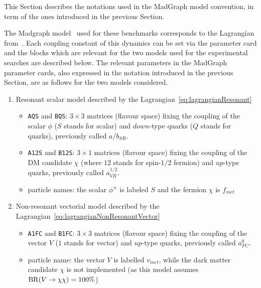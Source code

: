 % 



This Section describes the notations used in the MadGraph model convention, 
in term of the ones introduced in the previous Section.

The Madgraph model~\cite{MGmodel} used for these benchmarks corresponds to the Lagrangian from~\cite{AndreaFuksMaltoni}. 
Each coupling constant of this dynamics can be set via the parameter card and 
the blocks which are relevant for the two models used for the experimental searches are described below.
The relevant parameters in the MadGraph parameter cards, also expressed in the notation introduced in the 
previous Section, are as follows for the two models considered.

\begin{enumerate}

\item Resonant scalar model described by the Lagrangian~\eqref{eq:lagrangianResonant}
  \begin{itemize}
  \item \texttt{AQS} and \texttt{BQS}: $3\times 3$ matrices (flavour space) fixing the coupling of the scalar $\phi$ ($S$ stands for scalar) and $down$-type quarks ($Q$ stands for quarks), previously called $a/b_{SR}$.
  \item \texttt{A12S} and \texttt{B12S}: $3\times 1$ matrices (flavour space) fixing the coupling of the DM candidate $\chi$ (where $12$ stands for spin-$1/2$ fermion) and $up$-type quarks, previously called $a^{1/2}_{VR}$.
  \item particle names: the scalar $\phi^{\pm}$ is labeled $S$ and the fermion $\chi$ is $f_{met}$
  \end{itemize}  
  
\item Non-resonant vectorial model described by the Lagrangian~\eqref{eq:lagrangianNonResonantVector}
\begin{itemize}
\item \texttt{A1FC} and \texttt{B1FC}: $3\times 3$ matrices (flavour space) fixing the coupling of the vector $V$ ($1$ stands for vector) and $up$-type quarks, previously called $a^0_{FC}$. 
\item particle name: the vector $V$ is labelled $v_{met}$, while the dark matter candidate $\chi$ is not implemented (as this model assumes $\mathrm{BR}({V} \to {\chi\chi})=100\%$)
\end{itemize}

\end{enumerate}

